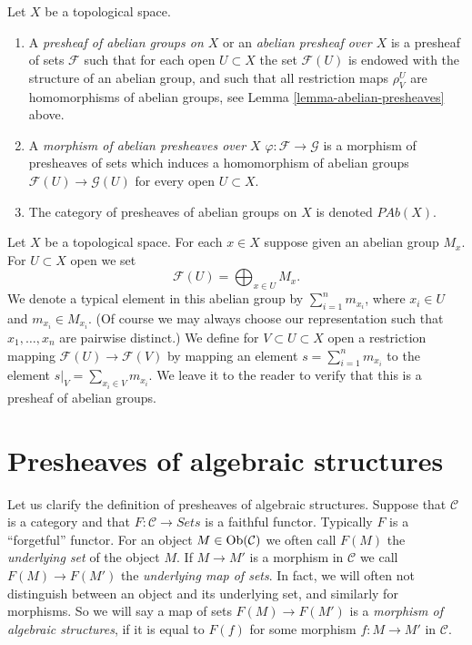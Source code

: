\begin{definition}
\label{definition-abelian-presheaves}
Let $X$ be a topological space.
\begin{enumerate}
\item A {\it presheaf of abelian groups on $X$} or an
{\it abelian presheaf over $X$}
is a presheaf of sets $\mathcal{F}$ such that for each open
$U \subset X$ the set $\mathcal{F}(U)$ is endowed with
the structure of an abelian group, and such that all restriction
maps $\rho^U_V$ are homomorphisms of abelian groups, see
Lemma \ref{lemma-abelian-presheaves} above.
\item A {\it morphism of abelian presheaves over $X$}
$\varphi : \mathcal{F} \to \mathcal{G}$ is a morphism of presheaves
of sets which induces
a homomorphism of abelian groups $\mathcal{F}(U) \to \mathcal{G}(U)$
for every open $U \subset X$.
\item The category of presheaves of abelian groups on $X$ is denoted
$\textit{PAb}(X)$.
\end{enumerate}
\end{definition}

\begin{example}
\label{example-direct-sum-points}
Let $X$ be a topological space. For each $x \in X$ suppose
given an abelian group $M_x$. For $U \subset X$ open
we set
$$
\mathcal{F}(U) = \bigoplus\nolimits_{x \in U} M_x.
$$
We denote a typical element in this abelian group by
$\sum_{i = 1}^n m_{x_i}$, where $x_i \in U$ and $m_{x_i} \in M_{x_i}$.
(Of course we may always choose our representation such that
$x_1, \ldots, x_n$ are pairwise distinct.)
We define for $V \subset U \subset X$ open a restriction
mapping $\mathcal{F}(U) \to \mathcal{F}(V)$ by
mapping an element $s = \sum_{i = 1}^n m_{x_i}$
to the element $s|_V = \sum_{x_i \in V} m_{x_i}$.
We leave it to the reader to verify that this is a
presheaf of abelian groups.
\end{example}



\section{Presheaves of algebraic structures}
\label{section-presheaves-structures}

\noindent
Let us clarify the definition
of presheaves of algebraic structures.
Suppose that $\mathcal{C}$ is a category and
that $F : \mathcal{C} \to \textit{Sets}$ is
a faithful functor. Typically $F$ is a ``forgetful''
functor. For an object $M \in \mathop{\mathrm{Ob}}\nolimits(\mathcal{C})$
we often call $F(M)$ the {\it underlying set} of the
object $M$. If $M \to M'$ is a morphism in $\mathcal{C}$
we call $F(M) \to F(M')$ the {\it underlying map of sets}.
In fact, we will often not distinguish between an object
and its underlying set, and similarly for morphisms.
So we will say a map of sets $F(M) \to F(M')$
is a {\it morphism of algebraic structures}, if it is
equal to $F(f)$ for some morphism $f : M \to M'$
in $\mathcal{C}$.

